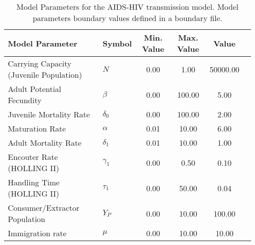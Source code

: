 \begin{table}
\centering
\begin{tabular}{p{5cm}lcccc}
{\bf Model Parameter} & {\bf Symbol} & {\bf Min. Value} & {\bf Max. Value} & {\bf Value}\\
\hline\hline
Carrying Capacity (Juvenile Population) & $N$ & 0.00 & 1.00 & 50000.00\\
Adult Potential Fecundity & $\beta$ & 0.00 & 100.00 & 5.00\\
Juvenile Mortality Rate & $\delta_0$ & 0.00 & 100.00 & 2.00\\
Maturation Rate & $\alpha$ & 0.01 & 10.00 & 6.00\\
Adult Mortality Rate & $\delta_1$ & 0.01 & 10.00 & 1.00\\
Encouter Rate (HOLLING II) & $\gamma_1$ & 0.00 & 0.50 & 0.10\\
Handling Time (HOLLING II) & $\tau_1$ & 0.00 & 50.00 & 0.04\\
Consumer/Extractor Population & $Y_P$ & 0.00 & 10.00 & 100.00\\
Immigration rate & $\mu$ & 0.00 & 10.00 & 10.00\\
\hline\hline
\end{tabular}
\caption{Model Parameters for the AIDS-HIV transmission model. Model parameters boundary values defined in a boundary file.}
\end{table}

